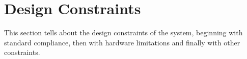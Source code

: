 \section{Design Constraints}
This section tells about the design constraints of the system, beginning with standard compliance, then with hardware limitations and finally with other constraints.
 
  
 



 
 